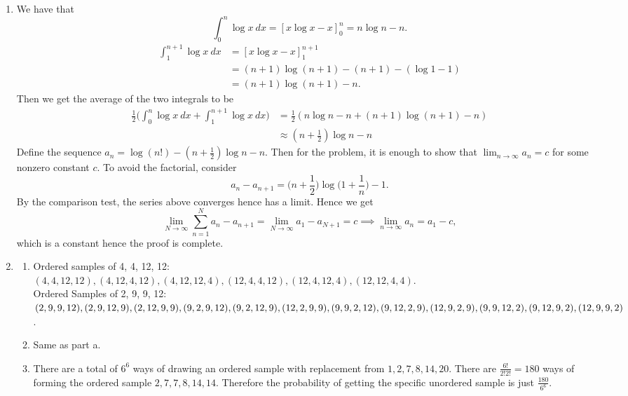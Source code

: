 \documentclass{article}
\begin{document}
\begin{enumerate}
    \item We have that
    \[ \int_{0}^{n} \log{x} \ dx = [x\log{x} - x]_{0}^{n} = n\log{n} - n. \]
    \begin{align*}
        \int_{1}^{n + 1} \log{x} \ dx
        &= [x\log{x} - x]_{1}^{n + 1} \\
        &= (n + 1)\log{(n + 1)} - (n + 1) - (\log{1} - 1) \\
        &= (n + 1)\log{(n + 1)} - n.
    \end{align*}
    Then we get the average of the two integrals to be
    \begin{align*}
        \frac{1}{2} \Big( \int_{0}^{n} \log{x} \ dx + \int_{1}^{n + 1} \log{x} \ dx \Big)
        &= \frac{1}{2}(n\log{n} - n + (n + 1)\log{(n + 1)} - n) \\
        &\approx (n + \frac{1}{2})\log{n} - n
    \end{align*}
    Define the sequence $a_n = \log{(n!)} - (n + \frac{1}{2})\log{n} - n$. Then for the
    problem, it is enough to show that $\lim_{n \to \infty} a_n = c$ for some nonzero constant
    $c$. To avoid the factorial, consider
    \[ a_n - a_{n + 1} = \Big( n + \frac{1}{2})\log{\Big(1 + \frac{1}{n} \Big)} - 1. \]
    By the comparison test, the series above converges hence has a limit. Hence we get
    \[ \lim_{N \to \infty} \sum_{n = 1}^{N} a_n - a_{n + 1}
    = \lim_{N \to \infty} a_1 - a_{N + 1} = c \implies \lim_{n \to \infty} a_n = a_1 - c, \]
    which is a constant hence the proof is complete.

    \item \begin{enumerate}
        \item Ordered samples of {4, 4, 12, 12}: \\
        $(4, 4, 12, 12), (4, 12, 4, 12), (4, 12, 12, 4), (12, 4, 4, 12), (12, 4, 12, 4),
        (12, 12, 4, 4)$. \\
        Ordered Samples of {2, 9, 9, 12}: \\
        $(2, 9, 9, 12), (2, 9, 12, 9), (2, 12, 9, 9), (9, 2, 9, 12), (9, 2, 12, 9),
        (12, 2, 9, 9), \\ (9, 9, 2, 12), (9, 12, 2, 9), (12, 9, 2, 9), (9, 9, 12, 2),
        (9, 12, 9, 2), (12, 9, 9, 2)$.

        \item Same as part a.

        \item There are a total of $6^6$ ways of drawing an ordered sample with replacement from
        ${1, 2, 7, 8, 14, 20}$. There are $\frac{6!}{2!2!} = 180$ ways of forming the ordered
        sample ${2, 7, 7, 8, 14, 14}$. Therefore the probability of getting the specific
        unordered sample is just $\frac{180}{6^6}$.


\end{enumerate}
\end{enumerate}
\end{document}
